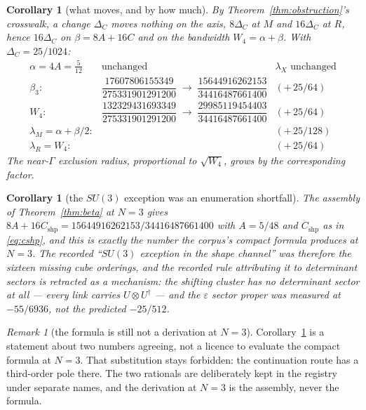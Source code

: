 \documentclass[11pt]{article}
\newtheorem{corollary}[theorem]{Corollary}
\theoremstyle{definition}
\theoremstyle{remark}
\newtheorem{remark}[theorem]{Remark}
\newcommand{\dg}{^{\dagger}}
\newcommand{\chk}[1]{}
\begin{document}
\begin{corollary}[what moves, and by how much]\label{cor:table}
By Theorem~\ref{thm:obstruction}'s crosswalk, a change $\Delta_C$ moves nothing
on the axis, $8\Delta_C$ at $M$ and $16\Delta_C$ at $R$, hence $16\Delta_C$ on
$\beta=8A+16C$ and on the bandwidth $W_4=\alpha+\beta$. With
$\Delta_C=25/1024$:
\[
\begin{array}{lll}
  \alpha=4A=\tfrac{5}{12} & \text{unchanged} & \lambda_X \text{ unchanged}\\[2pt]
  \beta_3: & \dfrac{17607806155349}{275331901291200}\;\longrightarrow\;
             \dfrac{15644916262153}{34416487661400} & (+\,25/64)\\[8pt]
  W_4: & \dfrac{132329431693349}{275331901291200}\;\longrightarrow\;
         \dfrac{29985119454403}{34416487661400} & (+\,25/64)\\[8pt]
  \lambda_M=\alpha+\beta/2: & & (+\,25/128)\\[2pt]
  \lambda_R=W_4: & & (+\,25/64)
\end{array}
\]
The near-$\Gamma$ exclusion radius, proportional to $\sqrt{W_4}$, grows by the
corresponding factor.\chk{the fourth-order shape table with the resolved C\_shp: beta\_3, W\_4, lambda\_M and lambda\_R move by 25/64, 25/64, 25/128 and 25/64; alpha and lambda\_X do not}
\end{corollary}

\begin{corollary}[the $SU(3)$ exception was an enumeration shortfall]\label{cor:noexception}
The assembly of Theorem~\ref{thm:beta} at $N=3$ gives
$8A+16C_{\mathrm{shp}}=15644916262153/34416487661400$ with $A=5/48$ and
$C_{\mathrm{shp}}$ as in \eqref{eq:cshp}, and this is exactly the number the
corpus's compact formula produces at $N=3$. The recorded ``$SU(3)$ exception in
the shape channel'' was therefore the sixteen missing cube orderings, and the
recorded rule attributing it to determinant sectors is retracted as a
mechanism: the shifting cluster has no determinant sector at all --- every link
carries $U\otimes U\dg$ --- and the $\varepsilon$ sector proper was measured at
$-55/6936$, not the predicted $-25/512$.\chk{the all-rank beta\_N formula at N = 3 is 8A + 16 C\_shp\_assembled exactly: the SU(3) exception in the shape channel was the cube shortfall}
\end{corollary}

\begin{remark}[the formula is still not a derivation at $N=3$]
Corollary~\ref{cor:noexception} is a statement about two numbers agreeing, not
a licence to evaluate the compact formula at $N=3$. That substitution stays
forbidden: the continuation route has a third-order pole there. The two
rationals are deliberately kept in the registry under separate names, and the
derivation at $N=3$ is the assembly, never the formula.
\end{remark}
\end{document}

